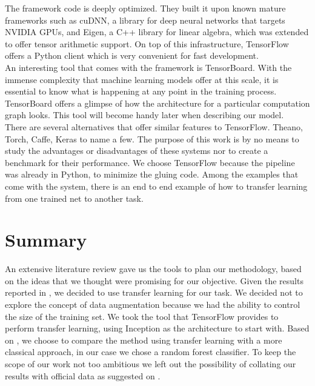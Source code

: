 The framework code is deeply optimized. They built it upon known mature frameworks such as cuDNN, a library for deep neural networks that targets NVIDIA GPUs, and Eigen, a C++ library for linear algebra, which was extended to offer tensor arithmetic support. On top of this infrastructure, TensorFlow offers a Python client which is very convenient for fast development.\\

An interesting tool that comes with the framework is TensorBoard. With the immense complexity that machine learning models offer at this scale, it is essential to know what is happening at any point in the training process. TensorBoard offers a glimpse of how the architecture for a particular computation graph looks. This tool will become handy later when describing our model.\\

There are several alternatives that offer similar features to TensorFlow. Theano, Torch, Caffe, Keras to name a few. The purpose of this work is by no means to study the advantages or disadvantages of these systems nor to create a benchmark for their performance. We choose TensorFlow because the pipeline was already in Python,  to minimize the gluing code. Among the examples that come with the system, there is an end to end example of how to transfer learning from one trained net to another task.\\

\section{Summary}

An extensive literature review gave us the tools to plan our methodology, based on the ideas that we thought were promising for our objective. Given the results reported in \cite{DBLP:journals/corr/YosinskiCBL14}, we decided to use transfer learning for our task. We decided not to explore the concept of data augmentation because we had the ability to control the size of the training set. We took the tool that TensorFlow provides to perform transfer learning, using Inception as the architecture to start with. Based on \cite{DBLP:journals/corr/RazavianASC14}, we choose to compare the method using transfer learning with a more classical approach, in our case we chose a random forest classifier. To keep the scope of our work not too ambitious we left out the possibility of collating our results with official data as suggested on \cite{Kryvasheyeue1500779}.






